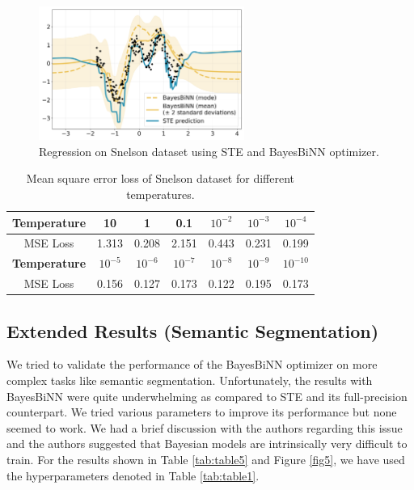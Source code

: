 \begin{figure}[h]
     \centering
         \includegraphics[width=0.6\textwidth]{../openreview/figs/Snelson.png}
         \caption{Regression on Snelson dataset using STE and BayesBiNN optimizer.}
         \label{fig4}
\end{figure}


\begin{table}[h]
\begin{center}
\setlength{\tabcolsep}{12pt}
\renewcommand{\arraystretch}{1.3}
\begin{tabular}{ | c | c | c | c | c | c | c | }
\hline
 \textbf{Temperature} & 10 & 1 & 0.1 & $10^{-2}$ & $10^{-3}$ & $10^{-4}$ \\\hline
 MSE Loss & 1.313 & 0.208 & 2.151 & 0.443 & 0.231 & 0.199\\ \hline
 \textbf{Temperature} & $10^{-5}$ & $10^{-6}$ & $10^{-7}$ & $10^{-8}$ & $10^{-9}$ & $10^{-10}$\\  \hline
 MSE Loss & 0.156 & 0.127 & 0.173 & 0.122 & 0.195 & 0.173\\ 
\hline
\end{tabular}
\caption{Mean square error loss of Snelson dataset for different temperatures.}
\label{tab:Ablation_result_4}

\end{center}
\end{table}

\subsection{Extended Results (Semantic Segmentation)}
We tried to validate the performance of the BayesBiNN optimizer on more complex tasks like semantic segmentation. Unfortunately, the results with BayesBiNN were quite underwhelming as compared to STE and its full-precision counterpart. We tried various parameters to improve its performance but none seemed to work. We had a brief discussion with the authors regarding this issue and the authors suggested that Bayesian models are intrinsically very difficult to train. For the results shown in Table \autoref{tab:table5} and Figure \autoref{fig5}, we have used the hyperparameters denoted in Table \autoref{tab:table1}.

